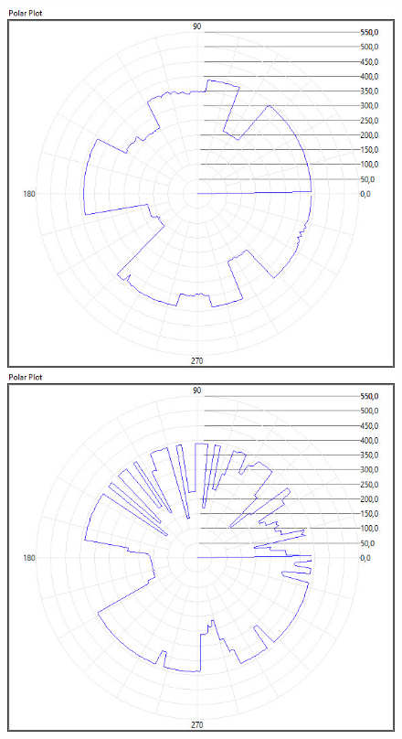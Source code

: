 \begin{figure}[ht]
    \centering
        \includegraphics[scale=0.2]{./mesurment/data/Lidar_1ms_9_oclock_detection}
        \includegraphics[scale=0.2]{./mesurment/data/Lidar_10ms_9_oclock_detection}\\

\end{figure}
